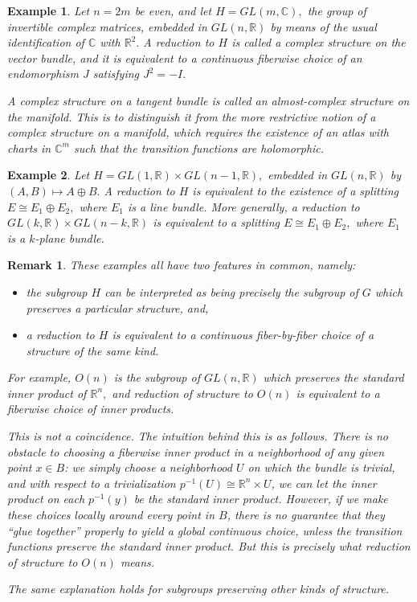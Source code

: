 \documentclass[12pt]{article}
\newcommand{\reals}{{\mathbb R}} %
\newcommand{\cpxs}{{\mathbb C}} %
\newcommand{\tuple}[1]{\left(#1\right)}
\newcommand{\inv}[1]{#1^{-1}}
\newtheorem{rmk}{Remark}
\newtheorem{exm}{Example}
\newcommand{\cross}{\times}
\newcommand{\homeo}{\cong}
\newcommand{\isom}{\cong}
\begin{document}
\begin{exm}
Let $n=2m$ be even, and let $H=GL(m,\cpxs),$ the group of invertible complex matrices, embedded in $GL(n,\reals)$ by means of the usual identification of $\cpxs$ with $\reals^2.$
A reduction to $H$ is called a {\em complex structure} on the vector bundle, and 
it is equivalent to a continuous fiberwise choice of an endomorphism $J$ satisfying $J^2=-I.$ 

A complex structure on a tangent bundle is called an {\em almost-complex structure\/} on the manifold. This is to distinguish it from the
more restrictive notion of a complex structure on a manifold, which requires the existence of an atlas with charts in $\cpxs^m$ such that the transition functions are holomorphic.
\end{exm}

\begin{exm}
Let $H=GL(1,\reals)\cross GL(n-1,\reals),$ embedded in $GL(n,\reals)$ by
$\tuple{A,B}\mapsto A\oplus B.$ A reduction to $H$ is equivalent to the 
existence of a splitting $E\isom E_1\oplus E_2,$ where $E_1$ is a line bundle.
More generally, a reduction to $GL(k,\reals)\cross GL(n-k,\reals)$ is equivalent to a splitting $E\isom E_1\oplus E_2,$ where $E_1$ is a $k$-plane bundle.
\end{exm}

\begin{rmk}
These examples all have two features in common, namely:
\begin{itemize}
\item
the subgroup $H$ can be interpreted as being precisely the subgroup of $G$ which preserves a particular structure, and,

\item
a reduction to $H$ is equivalent to a continuous fiber-by-fiber choice of a
structure of the same kind.
\end{itemize}

For example, $O(n)$ is the subgroup of $GL(n,\reals)$ which preserves the
standard inner product of $\reals^n,$ and reduction of structure to $O(n)$ is
equivalent to a fiberwise choice of inner products. 

This is not a coincidence. The intuition behind this is as follows. There
is no obstacle to choosing a fiberwise inner product in a neighborhood of any given point $x\in B$: we simply choose a neighborhood $U$ on which the bundle is trivial, and with respect to a trivialization $\inv{p}(U)\homeo\reals^n\cross U$, we can let the inner product on each $\inv{p}(y)$ be the standard inner product. However, if we make these choices locally around every point in $B$, 
there is no guarantee that they ``glue together'' properly to yield a global 
continuous choice, {\em unless} the transition functions preserve the standard 
inner product. But this is precisely what reduction of structure to $O(n)$ 
means.

The same explanation holds for subgroups preserving other kinds of structure. 

\end{rmk}

\end{document}

